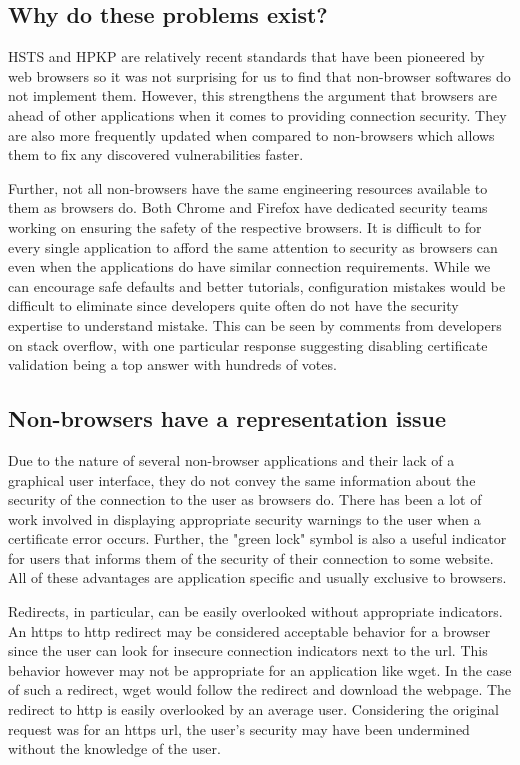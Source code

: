 \subsection{Why do these problems exist?}

HSTS and HPKP are relatively recent standards that have been pioneered by web
browsers so it was not surprising for us to find that non-browser softwares do
not implement them. However, this strengthens the argument that browsers are
ahead of other applications when it comes to providing connection security.
They are also more frequently updated when compared to non-browsers which
allows them to fix any discovered vulnerabilities faster.

Further, not all non-browsers have the same engineering resources available to
them as browsers do. Both Chrome and Firefox have dedicated security teams
working on ensuring the safety of the respective browsers. It is difficult to
for every single application to afford the same attention to security as
browsers can even when the applications do have similar connection
requirements. While we can encourage safe defaults and better tutorials,
configuration mistakes would be difficult to eliminate since developers quite
often do not have the security expertise to understand mistake. This can be
seen by comments from developers on stack overflow, with one particular
response suggesting disabling certificate validation being a top answer with
hundreds of votes.

\subsection{Non-browsers have a representation issue}
Due to the nature of several non-browser applications and their lack of a
graphical user interface, they do not convey the same information about the
security of the connection to the user as browsers do. There has been a lot of
work involved in displaying appropriate security warnings to the user when a
certificate error occurs. Further, the "green lock" symbol is also a useful
indicator for users that informs them of the security of their connection to
some website. All of these advantages are application specific and usually
exclusive to browsers.

Redirects, in particular, can be easily overlooked without appropriate
indicators. An https to http redirect may be considered acceptable behavior for
a browser since the user can look for insecure connection indicators next to
the url. This behavior however may not be appropriate for an application like
wget. In the case of such a redirect, wget would follow the redirect and download
the webpage. The redirect to http is easily overlooked by an average user.
Considering the original request was for an https url, the user's security
may have been undermined without the knowledge of the user.


